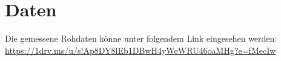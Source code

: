 

\chapter{Daten}

Die gemessene Rohdaten könne unter folgendem Link eingesehen werden:\\
\url{https://1drv.ms/u/s!Ap8DY8lEb1DBwH4yWeWRU46oaMHg?e=fMecIw}
